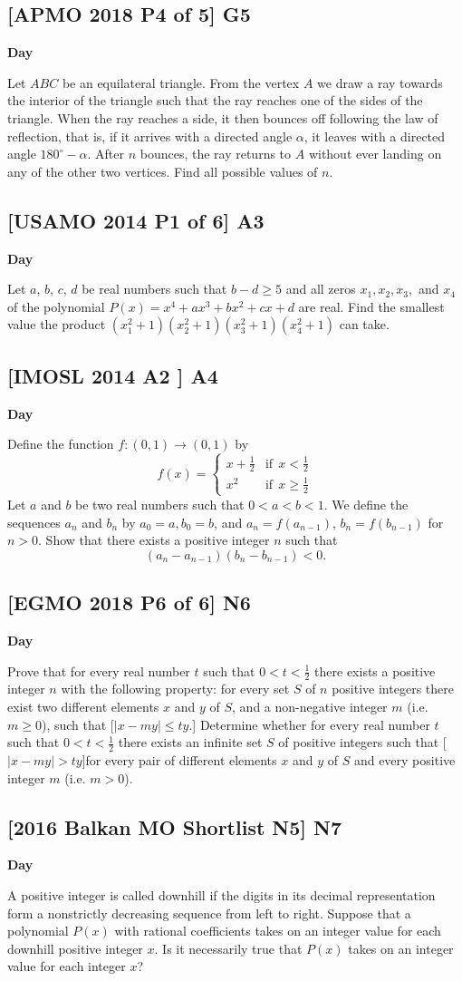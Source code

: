 \documentclass[10pt]{article}
\newcommand{\themonth}{March}
\newcommand{\theyear}{2019}
\newcounter{day}
\newcounter{solution}
\newcounter{datenumber}
\newcommand{\problem}[4][0]{
	\newpage
	\subsection{[#3] \space #2} \hfill 
	{\large\textbf{Day \arabic{day}}} %
	\begin{flushleft} #4 \end{flushleft}
	\vspace{1em}
	\addtocounter{day}{1}
	\addtocounter{datenumber}{1}
	\setcounter{solution}{1}
}
\begin{document}
\problem[126]{G5}{APMO 2018 P4 of 5}{Let $ABC$ be an equilateral triangle. From the vertex $A$ we draw a ray towards the interior of the triangle such that the ray reaches one of the sides of the triangle. When the ray reaches a side, it then bounces off following the law of reflection, that is, if it arrives with a directed angle $\alpha$, it leaves with a directed angle $180^{\circ}-\alpha$. After $n$ bounces, the ray returns to $A$ without ever landing on any of the other two vertices. Find all possible values of $n$.}

\problem[127]{A3}{USAMO 2014 P1 of 6}{Let $a$, $b$, $c$, $d$ be real numbers such that $b-d \ge 5$ and all zeros $x_1, x_2, x_3,$ and $x_4$ of the polynomial $P(x)=x^4+ax^3+bx^2+cx+d$ are real. Find the smallest value the product $(x_1^2+1)(x_2^2+1)(x_3^2+1)(x_4^2+1)$ can take.}

\problem[128]{A4}{IMOSL 2014 A2 }{Define the function $f:(0,1)\to (0,1)$ by \[\displaystyle f(x) = \left\{ \begin{array}{lr} x+\frac 12 & \text{if}\ \  x < \frac 12\\ x^2 & \text{if}\ \  x \ge \frac 12 \end{array} \right.\] Let $a$ and $b$ be two real numbers such that $0 < a < b < 1$. We define the sequences $a_n$ and $b_n$ by $a_0 = a, b_0 = b$, and $a_n = f( a_{n -1})$, $b_n = f (b_{n -1} )$ for $n > 0$. Show that there exists a positive integer $n$ such that \[(a_n - a_{n-1})(b_n-b_{n-1})<0.\]}

\renewcommand{\themonth}{August}
\setcounter{datenumber}{1}

\problem[129]{N6}{EGMO 2018 P6 of 6}{Prove that for every real number $t$ such that $0 < t < \tfrac{1}{2}$ there exists a positive integer $n$ with the following property: for every set $S$ of $n$ positive integers there exist two different elements $x$ and $y$ of $S$, and a non-negative integer $m$ (i.e. $m \ge 0 $), such that [$ |x-my|\leq ty$.] Determine whether for every real number $t$ such that $0 < t < \tfrac{1}{2} $ there exists an infinite set $S$ of positive integers such that [$|x-my| > ty$]for every pair of different elements $x$ and $y$ of $S$ and every positive integer $m$ (i.e. $m > 0$).}

\problem[130]{N7}{2016 Balkan MO Shortlist N5}{A positive integer is called downhill if the digits in its decimal representation form a nonstrictly decreasing sequence from left to right. Suppose that a polynomial $P(x)$ with rational coefficients takes on an integer value for each downhill positive integer $x$. Is it necessarily true that $P(x)$ takes on an integer value for each integer $x$?}
\end{document}
